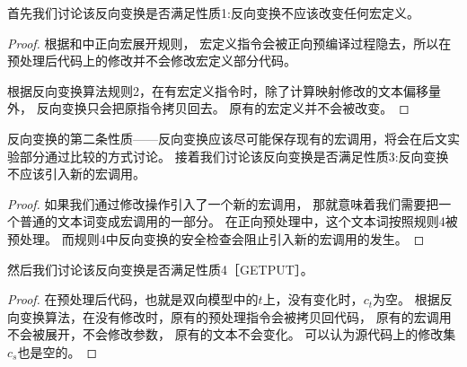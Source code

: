 首先我们讨论该反向变换是否满足性质1:反向变换不应该改变任何宏定义。
\begin{proof}
根据和中正向宏展开规则，
宏定义指令会被正向预编译过程隐去，所以在预处理后代码上的修改并不会修改宏定义部分代码。

根据反向变换算法规则2，在有宏定义指令时，除了计算映射修改的文本偏移量外，
反向变换只会把原指令拷贝回去。
原有的宏定义并不会被改变。
\end{proof}

反向变换的第二条性质——反向变换应该尽可能保存现有的宏调用，将会在后文实验部分通过比较的方式讨论。
接着我们讨论该反向变换是否满足性质3:反向变换不应该引入新的宏调用。
\begin{proof}
如果我们通过修改操作引入了一个新的宏调用，
那就意味着我们需要把一个普通的文本词变成宏调用的一部分。
在正向预处理中，这个文本词按照规则4被预处理。
而规则4中反向变换的安全检查会阻止引入新的宏调用的发生。
\end{proof}

然后我们讨论该反向变换是否满足性质4［GETPUT］。
\begin{proof}
在预处理后代码，也就是双向模型中的$t$上，没有变化时，$c_t$为空。
根据反向变换算法，在没有修改时，原有的预处理指令会被拷贝回代码，
原有的宏调用不会被展开，不会修改参数，
原有的文本不会变化。
可以认为源代码上的修改集$c_s$也是空的。
\end{proof}

